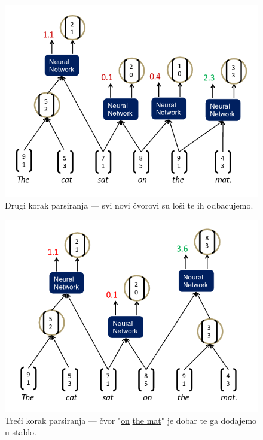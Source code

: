 \documentclass[a4paper,twoside,12pt]{memoir} %
\begin{document}
	\begin{figure}[H]
		\centering
		\includegraphics[scale = 0.70]{recursive_parse_2.png}

		\vspace*{-6pt}
		\caption{Drugi korak parsiranja --- svi novi čvorovi su loši te ih odbacujemo.}
	\end{figure}

	\newpage

	\begin{figure}[H]
		\centering
		\vspace*{-12pt}
		\includegraphics[scale = 0.70]{recursive_parse_3.png}

		\vspace*{-6pt}
		\caption{Treći korak parsiranja --- čvor "\underline{on} \underline{the mat}" je dobar te ga dodajemo u stablo.}
	\end{figure}
\end{document}
